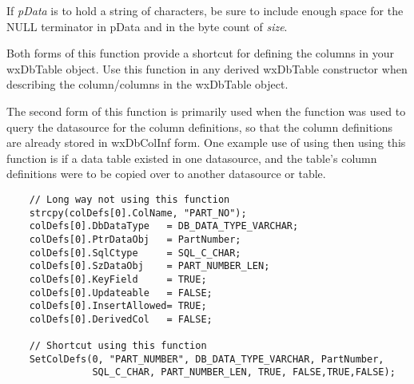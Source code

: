 

If {\it pData} is to hold a string of characters, be sure to include enough 
space for the NULL terminator in pData and in the byte count of {\it size}.

Both forms of this function provide a shortcut for defining the columns in 
your wxDbTable object.  Use this function in any derived wxDbTable 
constructor when describing the column/columns in the wxDbTable object.

The second form of this function is primarily used when the 
 function was used to query the 
datasource for the column definitions, so that the column definitions are 
already stored in wxDbColInf form.  One example use of using 
 then using this function is if 
a data table existed in one datasource, and the table's column definitions 
were to be copied over to another datasource or table.


\begin{verbatim}
    // Long way not using this function
    strcpy(colDefs[0].ColName, "PART_NO");
    colDefs[0].DbDataType   = DB_DATA_TYPE_VARCHAR;
    colDefs[0].PtrDataObj   = PartNumber;
    colDefs[0].SqlCtype     = SQL_C_CHAR;
    colDefs[0].SzDataObj    = PART_NUMBER_LEN;
    colDefs[0].KeyField     = TRUE;
    colDefs[0].Updateable   = FALSE;
    colDefs[0].InsertAllowed= TRUE;
    colDefs[0].DerivedCol   = FALSE;

    // Shortcut using this function
    SetColDefs(0, "PART_NUMBER", DB_DATA_TYPE_VARCHAR, PartNumber,
               SQL_C_CHAR, PART_NUMBER_LEN, TRUE, FALSE,TRUE,FALSE);
\end{verbatim}


\label{wxdbtablesetcursor}




